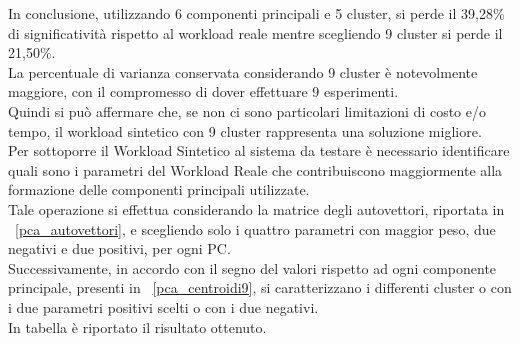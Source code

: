 In conclusione, utilizzando 6 componenti principali e 5 cluster, si perde il 39,28\%
di significatività rispetto al workload reale mentre scegliendo 9 cluster si perde il 21,50\%.\\
La percentuale di varianza conservata considerando 9 cluster è notevolmente maggiore,
con il compromesso di dover effettuare 9 esperimenti.\\
Quindi si può affermare che, se non ci sono particolari limitazioni di costo e/o tempo,
il workload sintetico con 9 cluster rappresenta una soluzione migliore.\\
Per sottoporre il Workload Sintetico al sistema da testare è necessario identificare
quali sono i parametri del Workload Reale che contribuiscono maggiormente
alla formazione delle componenti principali utilizzate.\\
Tale operazione si effettua considerando la matrice degli autovettori, riportata
in \figurename~\ref{pca_autovettori}, e scegliendo solo i quattro parametri con maggior
peso, due negativi e due positivi, per ogni PC.\\
Successivamente, in accordo con il segno del valori rispetto ad ogni componente
principale, presenti in \figurename~\ref{pca_centroidi9}, si caratterizzano i
differenti cluster o con i due parametri positivi scelti o con i due negativi.\\
In tabella è riportato il risultato ottenuto.
